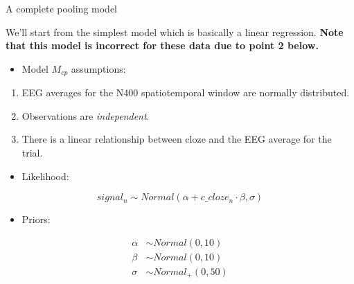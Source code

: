 \documentclass[12pt,ignorenonframetext,aspectratio=169]{beamer}
\providecommand{\tightlist}{%
  \setlength{\itemsep}{0pt}\setlength{\parskip}{0pt}}
\begin{document}
\begin{frame}{A complete pooling model}
\protect\hypertarget{a-complete-pooling-model}{}

We'll start from the simplest model which is basically a linear regression. \textbf{Note that this model is incorrect for these data due to point 2 below.}

\begin{itemize}
\tightlist
\item
  Model \(M_{cp}\) assumptions:
\end{itemize}

\begin{enumerate}
\tightlist
\item
  EEG averages for the N400 spatiotemporal window are normally distributed.
\item
  Observations are \emph{independent}.
\item
  There is a linear relationship between cloze and the EEG average for the trial.
\end{enumerate}

\end{frame}

\begin{frame}

\begin{itemize}
\tightlist
\item
  Likelihood:
\end{itemize}

\begin{equation}
   signal_n \sim Normal(\alpha + c\_cloze_n \cdot \beta,\sigma)
   \end{equation}

\begin{itemize}
\tightlist
\item
  Priors:
\end{itemize}

\begin{equation}
 \begin{aligned}
 \alpha &\sim Normal(0,10)\\
 \beta  &\sim Normal(0,10)\\
 \sigma  &\sim Normal_{+}(0,50)
 \end{aligned}
 \end{equation}

\end{frame}
\end{document}
